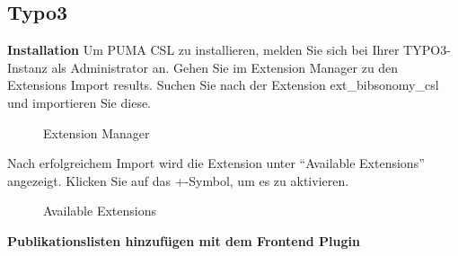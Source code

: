 \subsection{Typo3}
\label{subsec:typo3}
\textbf{Installation}\newline\newline
Um PUMA CSL zu installieren, melden Sie sich bei Ihrer TYPO3-Instanz als Administrator an. Gehen Sie im Extension Manager zu den Extensions Import results. Suchen Sie nach der Extension ext\_bibsonomy\_csl und importieren Sie diese.
\begin{figure}[h!]
 \centering
 \caption{Extension Manager}
 \label{fig:extensionManager}
\end{figure}
Nach erfolgreichem Import wird die Extension unter \enquote{Available Extensions} angezeigt. Klicken Sie auf das +-Symbol, um es zu aktivieren.
\begin{figure}[h!]
 \centering
 \caption{Available Extensions}
 \label{fig:availableExtensions}
\end{figure}
\newline\newline
\textbf{Publikationslisten hinzufügen mit dem Frontend Plugin}\newline\newline
